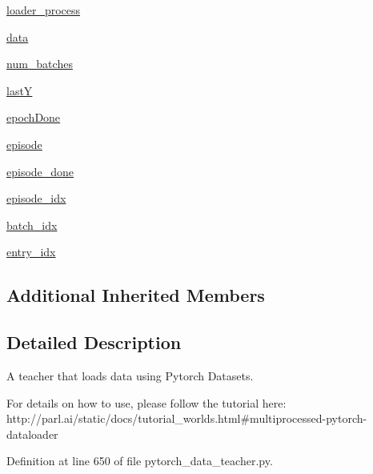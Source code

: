 \begin{DoxyCompactItemize}
\hyperlink{classparlai_1_1core_1_1pytorch__data__teacher_1_1PytorchDataTeacher_a7d0c50251b2e88746aa6a6ff4a454ca8}{loader\+\_\+process}
\item 
\hyperlink{classparlai_1_1core_1_1pytorch__data__teacher_1_1PytorchDataTeacher_afc57c27e502b27aff86630e7d9768700}{data}
\item 
\hyperlink{classparlai_1_1core_1_1pytorch__data__teacher_1_1PytorchDataTeacher_abaa8cbd02f036fb06d9e5290d331bb40}{num\+\_\+batches}
\item 
\hyperlink{classparlai_1_1core_1_1pytorch__data__teacher_1_1PytorchDataTeacher_a452bb226c67e6c4002679fa293433e27}{lastY}
\item 
\hyperlink{classparlai_1_1core_1_1pytorch__data__teacher_1_1PytorchDataTeacher_ad39ab22ed0829965a4e418ccda1f5b51}{epoch\+Done}
\item 
\hyperlink{classparlai_1_1core_1_1pytorch__data__teacher_1_1PytorchDataTeacher_a65bef2570fe8e94a2077fc30240e4524}{episode}
\item 
\hyperlink{classparlai_1_1core_1_1pytorch__data__teacher_1_1PytorchDataTeacher_a7b3026e037904f2e92282729dc53bd13}{episode\+\_\+done}
\item 
\hyperlink{classparlai_1_1core_1_1pytorch__data__teacher_1_1PytorchDataTeacher_a096cd29f1b94d0fb626505907280494e}{episode\+\_\+idx}
\item 
\hyperlink{classparlai_1_1core_1_1pytorch__data__teacher_1_1PytorchDataTeacher_af2d84c6c04e53cc119de23ad07efbbe3}{batch\+\_\+idx}
\item 
\hyperlink{classparlai_1_1core_1_1pytorch__data__teacher_1_1PytorchDataTeacher_ab0e45ca1923e9b99747c117dfbaa95f3}{entry\+\_\+idx}
\end{DoxyCompactItemize}
\subsection*{Additional Inherited Members}


\subsection{Detailed Description}
\begin{DoxyVerb}A teacher that loads data using Pytorch Datasets.

For details on how to use, please follow the tutorial here:
http://parl.ai/static/docs/tutorial_worlds.html#multiprocessed-pytorch-dataloader
\end{DoxyVerb}
 

Definition at line 650 of file pytorch\+\_\+data\+\_\+teacher.\+py.



